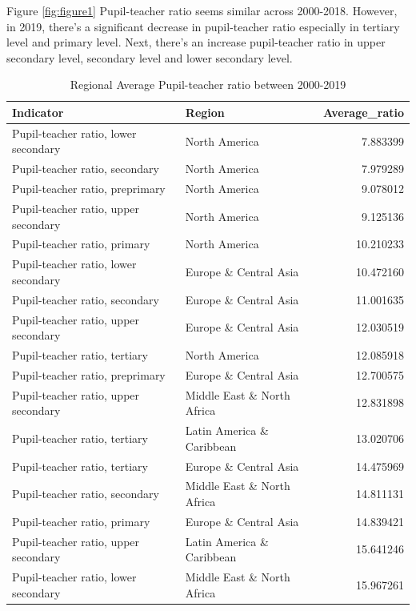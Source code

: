 \documentclass[11pt,a4paper,]{article}
\begin{document}
Figure \ref{fig:figure1} Pupil-teacher ratio seems similar across 2000-2018. However, in 2019, there's a significant decrease in pupil-teacher ratio especially in tertiary level and primary level. Next, there's an increase pupil-teacher ratio in upper secondary level, secondary level and lower secondary level.

\begin{table}

\caption{\label{tab:Table2}Regional Average Pupil-teacher ratio between 2000-2019}
\centering
\begin{tabular}[t]{l|l|r}
\hline
Indicator & Region & Average\_ratio\\
\hline
Pupil-teacher ratio, lower secondary & North America & 7.883399\\
\hline
Pupil-teacher ratio, secondary & North America & 7.979289\\
\hline
Pupil-teacher ratio, preprimary & North America & 9.078012\\
\hline
Pupil-teacher ratio, upper secondary & North America & 9.125136\\
\hline
Pupil-teacher ratio, primary & North America & 10.210233\\
\hline
Pupil-teacher ratio, lower secondary & Europe \& Central Asia & 10.472160\\
\hline
Pupil-teacher ratio, secondary & Europe \& Central Asia & 11.001635\\
\hline
Pupil-teacher ratio, upper secondary & Europe \& Central Asia & 12.030519\\
\hline
Pupil-teacher ratio, tertiary & North America & 12.085918\\
\hline
Pupil-teacher ratio, preprimary & Europe \& Central Asia & 12.700575\\
\hline
Pupil-teacher ratio, upper secondary & Middle East \& North Africa & 12.831898\\
\hline
Pupil-teacher ratio, tertiary & Latin America \& Caribbean & 13.020706\\
\hline
Pupil-teacher ratio, tertiary & Europe \& Central Asia & 14.475969\\
\hline
Pupil-teacher ratio, secondary & Middle East \& North Africa & 14.811131\\
\hline
Pupil-teacher ratio, primary & Europe \& Central Asia & 14.839421\\
\hline
Pupil-teacher ratio, upper secondary & Latin America \& Caribbean & 15.641246\\
\hline
Pupil-teacher ratio, lower secondary & Middle East \& North Africa & 15.967261\\

\end{tabular}
\end{table}
\end{document}
